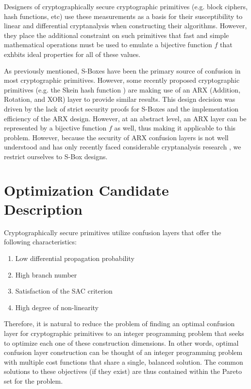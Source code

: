 \documentclass[11pt]{article}
\begin{document}
Designers of cryptographically secure cryptographic primitives (e.g. block ciphers, hash functions, etc) use these measurements as a basis for their susceptibility to linear and differential cryptanalysis when constructing their algorithms. However, they place the additional constraint on such primitives that fast and simple mathematical operations must be used to emulate a bijective function $f$ that exhbits ideal properties for all of these values.

As previously mentioned, S-Boxes have been the primary source of confusion in most cryptographic primitives. However, some recently proposed cryptographic primitives (e.g. the Skein hash function \cite{Ferguson09theskein}) are making use of an ARX (Addition, Rotation, and XOR) layer to provide similar results. This design decision was driven by the lack of strict security proofs for S-Boxes and the implementation efficiency of the ARX design. However, at an abstract level, an ARX layer can be represented by a bijective function $f$ as well, thus making it applicable to this problem. However, because the security of ARX confusion layers is not well understood and has only recently faced considerable cryptanalysis research \cite{}, we restrict ourselves to S-Box designs.

\section{Optimization Candidate Description}
Cryptographically secure primitives utilize confusion layers that offer the following characteristics:

\begin{enumerate}
	\item Low differential propagation probability
	\item High branch number
	\item Satisfaction of the SAC criterion
	\item High degree of non-linearity
\end{enumerate}

Therefore, it is natural to reduce the problem of finding an optimal confusion layer for cryptographic primitives to an integer programming problem that seeks to optimize each one of these construction dimensions. In other words, optimal confusion layer construction can be thought of an integer programming problem with multiple cost functions that share a single, balanced solution. The common solutions to these objectives (if they exist) are thus contained within the Pareto set for the problem.
\end{document}
